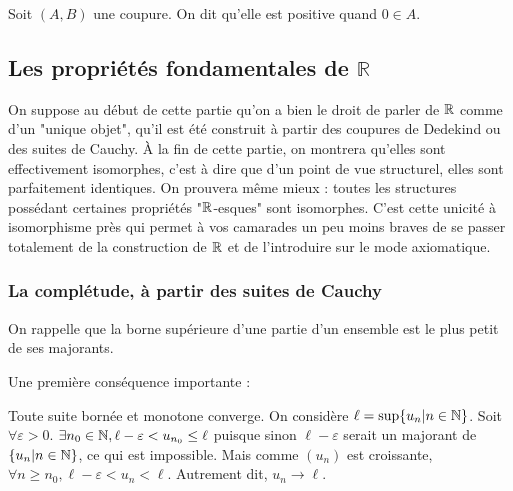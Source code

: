 \begin{defini}
    Soit $(A,B)$ une coupure. On dit qu'elle est positive quand $0\in A$. 
\end{defini}

\begin{defini}[Multiplication]
    
\end{defini}

\subsection{Les propriétés fondamentales de \texorpdfstring{$\mathbb{R}$}{R}}
On suppose au début de cette partie qu'on a bien le droit de parler de $\mathbb{R}$ comme d'un "unique objet", qu'il est été construit à partir des coupures de Dedekind ou des suites de Cauchy. À la fin de cette partie, on montrera qu'elles sont effectivement isomorphes, c'est à dire que d'un point de vue structurel, elles sont parfaitement identiques. On prouvera même mieux : toutes les structures possédant certaines propriétés "$\mathbb{R}$-esques" sont isomorphes. C'est cette unicité à isomorphisme près qui permet à vos camarades un peu moins braves de se passer totalement de la construction de $\mathbb{R}$ et de l'introduire sur le mode axiomatique.

\subsubsection{La complétude, à partir des suites de Cauchy}

On rappelle que la borne supérieure d'une partie d'un ensemble est le plus petit de ses majorants.

\begin{prop}
    
\end{prop}

Une première conséquence importante :

\begin{theoreme} \label{limmono}
    Toute suite bornée et monotone converge.
    \tcblower
    On considère $\ell=\sup\{u_n|n\in \mathbb{N}\}$. Soit $\forall\varepsilon > 0$. $\exists n_0 \in \mathbb{N}, \ell-\varepsilon<u_{n_0}\leq \ell$ puisque sinon $\ell-\varepsilon$ serait un majorant de $\{u_n|n\in \mathbb{N}\}$, ce qui est impossible. Mais comme $(u_n)$ est croissante, $\forall n \geq n_0, \ell-\varepsilon < u_n < \ell$. Autrement dit, $u_n \to \ell$.
\end{theoreme}


